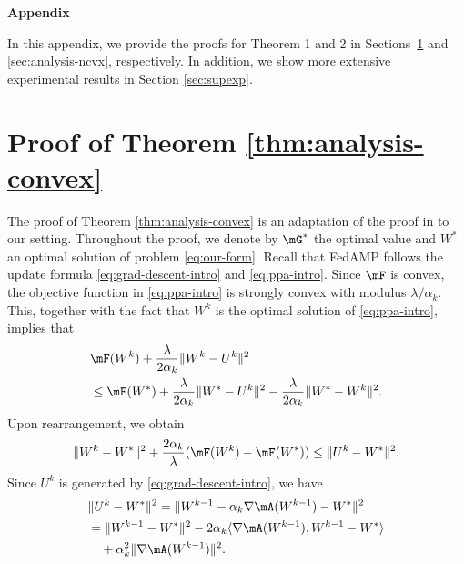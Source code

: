 \clearpage
\appendix
\begin{center}
{\Large \bf Appendix}
\end{center}
\setcounter{section}{0}
In this appendix, we provide the proofs for Theorem 1 and 2 in Sections~\ref{sec:analysis-convex} and \ref{sec:analysis-ncvx}, respectively. In addition, we show more extensive experimental results in Section \ref{sec:supexp}.

\section{Proof of Theorem \ref{thm:analysis-convex}}\label{sec:analysis-convex}
The proof of Theorem \ref{thm:analysis-convex} is an adaptation of the proof in \cite{bertsekas2011incremental} to our setting.
Throughout the proof, we denote by $\mG^*$ the optimal value and $W^*$ an optimal solution of problem \eqref{eq:our-form}. Recall that {FedAMP} follows the update formula \eqref{eq:grad-descent-intro} and \eqref{eq:ppa-intro}. 
Since $\mF$ is convex, the objective function in \eqref{eq:ppa-intro} is strongly convex with modulus $\lambda/\alpha_k$. This, together with the fact that $W^k$ is the optimal solution of \eqref{eq:ppa-intro}, implies that
$$ 
\begin{aligned} 
& \mF(W^k) + \frac{\lambda}{2\alpha_k}\|W^k - U^k\|^2 \\
& \leq \mF(W^*) + \frac{\lambda}{2\alpha_k}\|W^* - U^k\|^2 - \frac{\lambda}{2\alpha_k}\|W^* - W^k\|^2. 
\end{aligned}
$$
Upon rearrangement, we obtain
\begin{equation}
\label{eq:decrease-ppa}
\|W^k - W^*\|^2 + \frac{2\alpha_k}{\lambda}(\mF(W^k) - \mF(W^*)) \leq \|U^k - W^*\|^2.
\end{equation}
Since $U^k$ is generated by \eqref{eq:grad-descent-intro}, we have
\begin{align*}
& \|U^k - W^*\|^2 = \|W^{k-1} - \alpha_k\nabla\mA(W^{k-1}) - W^*\|^2 \\
& = \|W^{k-1} - W^*\|^2 - 2\alpha_k\langle\nabla \mA(W^{k-1}), W^{k-1} - W^*\rangle \\ 
& \quad + \alpha_k^2 \|\nabla\mA(W^{k-1})\|^2.
\end{align*}
